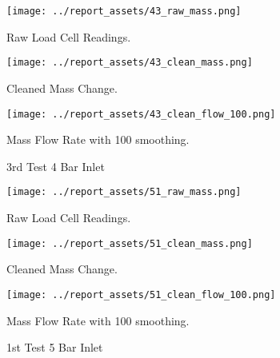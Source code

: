 \begin{figure}[htbp]
    \centering

    \begin{minipage}{0.3\textwidth}
        \centering
        \texttt{[image: ../report\_assets/43\_raw\_mass.png]}
        \caption*{Raw Load Cell Readings.}
    \end{minipage}
    \hfill
    \begin{minipage}{0.3\textwidth}
        \centering
        \texttt{[image: ../report\_assets/43\_clean\_mass.png]}
        \caption*{Cleaned Mass Change.}
    \end{minipage}
    \hfill
    \begin{minipage}{0.3\textwidth}
        \centering
        \texttt{[image: ../report\_assets/43\_clean\_flow\_100.png]}
        \caption*{Mass Flow Rate with 100 smoothing.}
    \end{minipage}
    \caption{3rd Test 4 Bar Inlet}
    
\end{figure}\label{fig:43}
\newpage
\begin{figure}[htbp]
    \centering

    \begin{minipage}{0.3\textwidth}
        \centering
        \texttt{[image: ../report\_assets/51\_raw\_mass.png]}
        \caption*{Raw Load Cell Readings.}
    \end{minipage}
    \hfill
    \begin{minipage}{0.3\textwidth}
        \centering
        \texttt{[image: ../report\_assets/51\_clean\_mass.png]}
        \caption*{Cleaned Mass Change.}
    \end{minipage}
    \hfill
    \begin{minipage}{0.3\textwidth}
        \centering
        \texttt{[image: ../report\_assets/51\_clean\_flow\_100.png]}
        \caption*{Mass Flow Rate with 100 smoothing.}
    \end{minipage}
    \caption{1st Test 5 Bar Inlet}
    
\end{figure}\label{fig:51}

